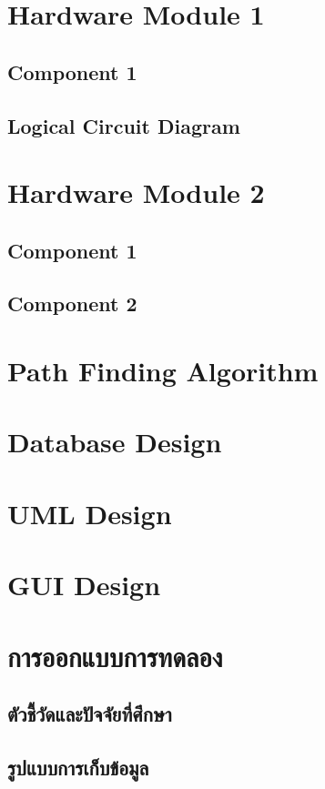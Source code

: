 \documentclass[12pt,oneside,openright,a4paper]{cpe-thai-project}
\begin{document}
\section{Hardware Module 1}
\subsection{Component 1}
\subsection{Logical Circuit Diagram}

\section{Hardware Module 2}
\subsection{Component 1}
\subsection{Component 2}

\section{Path Finding Algorithm}

\section{Database Design}

\section{UML Design}

\section{GUI Design}

\section{การออกแบบการทดลอง}
\subsection{ตัวชี้วัดและปัจจัยที่ศึกษา}
\subsection{รูปแบบการเก็บข้อมูล}
\end{document}
